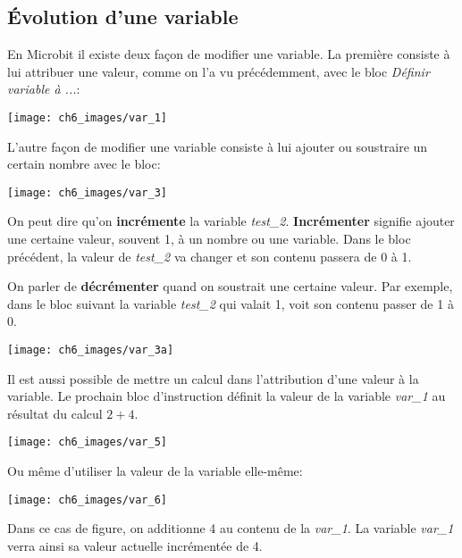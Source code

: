 \documentclass[11pt, a4paper]{book}
\begin{document}
\subsection{\'Evolution d'une variable}

En Microbit il existe deux façon de modifier une variable. La première consiste à lui attribuer une valeur, comme on l'a vu précédemment, avec le bloc {\it Définir variable à ...}:

\begin{center}
\texttt{[image: ch6\_images/var\_1]}
\end{center}

L'autre façon de modifier une variable consiste à lui ajouter ou soustraire un certain nombre avec le bloc:

\begin{center}
\texttt{[image: ch6\_images/var\_3]}
\end{center}

On peut dire qu'on {\bf incrémente} la variable {\it test\_2}. {\bf Incrémenter} signifie ajouter une certaine valeur, souvent 1, à un nombre ou une variable. Dans le bloc précédent, la valeur de {\it test\_2} va changer et son contenu passera de 0 à 1. 

On parler de {\bf décrémenter} quand on soustrait une certaine valeur. Par exemple, dans le bloc suivant la variable {\it test\_2} qui valait 1, voit son contenu passer de 1 à 0.

\begin{center}
\texttt{[image: ch6\_images/var\_3a]}
\end{center}

Il est aussi possible de mettre un calcul dans l'attribution d'une valeur à la variable. Le prochain bloc d'instruction définit la valeur de la variable {\it var\_1} au résultat du calcul $2+4$.

\begin{center}
\texttt{[image: ch6\_images/var\_5]}
\end{center}

Ou même d'utiliser la valeur de la variable elle-même:

\begin{center}
\texttt{[image: ch6\_images/var\_6]}
\end{center}
Dans ce cas de figure, on additionne 4 au contenu de la {\it var\_1}. La variable {\it var\_1} verra ainsi sa valeur actuelle incrémentée de 4.
\end{document}
